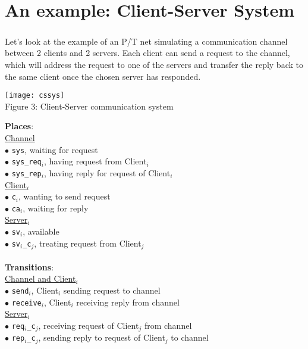 \documentclass{article}
\begin{document}
	\section{An example: Client-Server System}
	\subparagraph{}Let's look at the example of an P/T net simulating a communication channel between 2 clients and 2 servers. Each client can send a request to the channel, which will address the request to one of the servers and transfer the reply back to the same client once the chosen server has responded.
	\begin{center}
		\texttt{[image: cssys]}
		\\Figure 3: Client-Server communication system
	\end{center}
		\textbf{Places}:
		\\\underline{Channel}
		\\$\bullet$ \texttt{sys}, waiting for request
		\\$\bullet$ \texttt{sys\_req$_{i}$}, having request from Client$_i$
		\\$\bullet$ \texttt{sys\_rep$_{i}$}, having reply for request of Client$_i$
		\\
		\underline{Client$_i$}
		\\$\bullet$ \texttt{c$_i$}, wanting to send request
		\\$\bullet$ \texttt{ca$_i$}, waiting for reply
		\\
		\underline{Server$_i$}
		\\$\bullet$ \texttt{sv$_i$}, available
		\\$\bullet$ \texttt{sv$_i$\_c$_j$}, treating request from Client$_j$
		\\\\\textbf{Transitions}:
		\\\underline{Channel and Client$_i$}
		\\$\bullet$ \texttt{send$_i$}, Client$_i$ sending request to channel
		\\$\bullet$ \texttt{receive$_i$}, Client$_i$ receiving reply from channel
		\\\underline{Server$_i$}
		\\$\bullet$ \texttt{req$_i$\_c$_j$}, receiving request of Client$_j$ from channel
		\\$\bullet$ \texttt{rep$_i$\_c$_j$}, sending reply to request of Client$_j$ to channel
		\\\\
\end{document}
